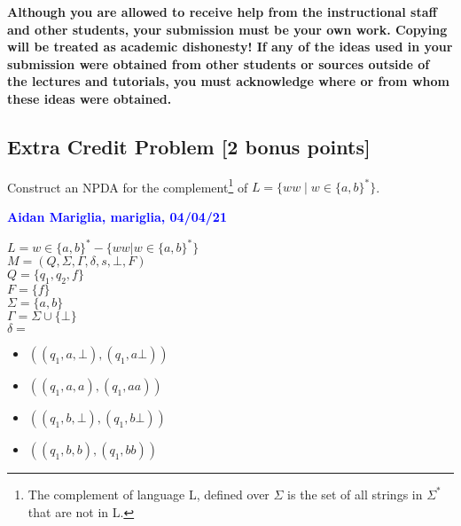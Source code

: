 \documentclass[11pt,fleqn]{article}
\newcommand{\bi}{\begin{itemize}}
\newcommand{\ei}{\end{itemize}}
\begin{document}
\textbf{Although you are allowed to receive help from the
  instructional staff and other students, your submission must be your
  own work.  Copying will be treated as academic dishonesty! If any of
  the ideas used in your submission were obtained from other students
  or sources outside of the lectures and tutorials, you must
  acknowledge where or from whom these ideas were obtained.}

\newpage

\subsection*{Extra Credit Problem \textbf{[2 bonus points]}}

Construct an NPDA for the complement\footnote{The complement of language L, defined over $\Sigma$ is the set of all strings in $\Sigma^*$ that are not in L.} of $L = \{ ww \mid w \in \{a,b\}^*\}$.
\\

\bigskip

\noindent
\textcolor{blue}{\textbf{Aidan Mariglia, mariglia, 04/04/21}}

\bigskip

\noindent

$L = w \in \{a, b\}^* - \{ww | w \in \{a, b\}^* \}$\\

$M = (Q, \Sigma, \Gamma, \delta, s, \bot, F)$\\
$Q = \{q_1, q_2, f\}$\\
$F = \{f\}$\\
$\Sigma = \{a, b\}$\\
$\Gamma = \Sigma \cup \{\bot\}$\\
$\delta = $\\
\bi
  \item $((q_1, a, \bot),(q_1, a\bot))$
  \item $((q_1, a, a),(q_1, aa))$
  \item $((q_1, b, \bot),(q_1, b\bot))$
  \item $((q_1, b, b),(q_1, bb))$
\ei
\end{document}
